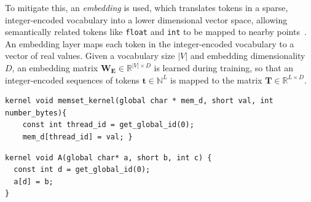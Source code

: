 To mitigate this, an \emph{embedding} is used, which translates tokens in a sparse, integer-encoded vocabulary into a lower dimensional vector space, allowing semantically related tokens like \texttt{float} and \texttt{int} to be mapped to nearby points~\cite{Mikolov2013a,Baroni2014}. An embedding layer maps each token in the integer-encoded vocabulary to a vector of real values. Given a vocabulary size $|V|$ and embedding dimensionality $D$, an embedding matrix $\bm{W_{E}} \in \mathbb{R}^{|V| \times D}$ is learned during training, so that an integer-encoded sequences of tokens $\bm{t} \in \mathbb{N}^{L}$ is mapped to the matrix $\bm{T} \in \mathbb{R}^{L \times D}$. 

\newsavebox{\NvidiaStreamClusterInput}
\begin{lrbox}{\NvidiaStreamClusterInput}
  \begin{minipage}{\textwidth}
    \begin{verbatim}
kernel void memset_kernel(global char * mem_d, short val, int number_bytes){
    const int thread_id = get_global_id(0);
    mem_d[thread_id] = val; }
    \end{verbatim}
  \end{minipage}
\end{lrbox}

\newsavebox{\NvidiaStreamClusterOutput}
\begin{lrbox}{\NvidiaStreamClusterOutput}
  \begin{minipage}{\textwidth}
    \begin{verbatim}
kernel void A(global char* a, short b, int c) {
  const int d = get_global_id(0);
  a[d] = b;
}
    \end{verbatim}
  \end{minipage}
\end{lrbox}

